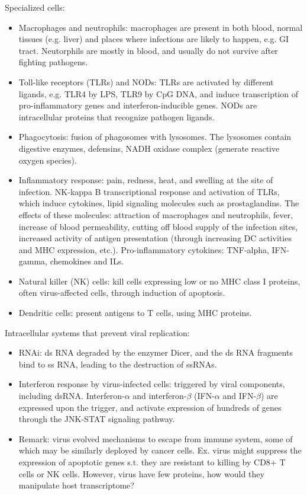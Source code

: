 \documentclass{report}
\begin{document}
Specialized cells: 
\begin{itemize}
	\item Macrophages and neutrophils: macrophages are present in both blood, normal tissues (e.g. liver) and places where infections are likely to happen, e.g. GI tract. Neutorphils are mostly in blood, and usually do not survive after fighting pathogens. 
	\item Toll-like receptors (TLRs) and NODs: TLRs are activated by different ligands, e.g. TLR4 by LPS, TLR9 by CpG DNA, and induce transcription of pro-inflammatory genes and interferon-inducible genes. NODs are intracellular proteins that recognize pathogen ligands. 
	\item Phagocytosis: fusion of phagosomes with lysosomes. The lysosomes contain digestive enzymes, defensins, NADH oxidase complex (generate reactive oxygen species). 
	\item Inflammatory response: pain, redness, heat, and swelling at the site of infection. NK-kappa B transcriptional response and activation of TLRs, which induce cytokines, lipid signaling molecules such as prostaglandins. The effects of these molecules: attraction of macrophages and neutrophils, fever, increase of blood permeability, cutting off blood supply of the infection sites, increased activity of antigen presentation (through increasing DC activities and MHC expression, etc.). Pro-inflammatory cytokines: TNF-alpha, IFN-gamma, chemokines and ILs. 
	\item Natural killer (NK) cells: kill cells expressing low or no MHC class I proteins, often virus-affected cells, through induction of apoptosis. 
	\item Dendritic cells: present antigens to T cells, using MHC proteins. 
\end{itemize}

Intracellular systems that prevent viral replication: 
\begin{itemize}
	\item RNAi: ds RNA degraded by the enzymer Dicer, and the ds RNA fragments bind to ss RNA, leading to the destruction of ssRNAs. 
	
	\item Interferon response by virus-infected cells: triggered by viral components, including dsRNA. Interferon-$\alpha$ and interferon-$\beta$ (IFN-$\alpha$ and IFN-$\beta$) are expressed upon the trigger, and activate expression of hundreds of genes through the JNK-STAT signaling pathway. 
	
	\item Remark: virus evolved mechanisms to escape from immune system, some of which may be similarly deployed by cancer cells. Ex. virus might suppress the expression of apoptotic genes s.t. they are resistant to killing by CD8+ T cells or NK cells. However, virus have few proteins, how would they manipulate host transcriptome? 
\end{itemize}
\end{document}
